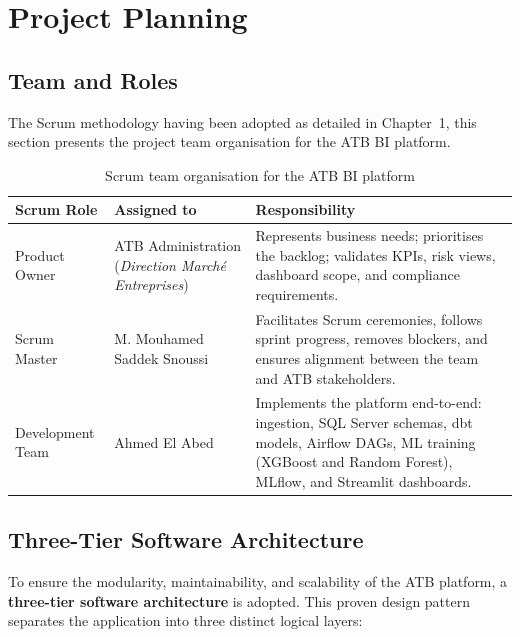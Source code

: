 \section{Project Planning}

\subsection{Team and Roles}

The Scrum methodology having been adopted as detailed in Chapter~1, this section presents
the project team organisation for the ATB BI platform.

\begin{table}[H]
\centering
\caption{Scrum team organisation for the ATB BI platform}
\label{tab:atb_project_roles}
\begin{tabular}{|p{3.5cm}|p{3.8cm}|p{6.2cm}|}
\hline
\rowcolor{blue!15}
\textbf{Scrum Role} & \textbf{Assigned to} & \textbf{Responsibility} \\
\hline
Product Owner & ATB Administration (\textit{Direction March\'{e} Entreprises}) &
Represents business needs; prioritises the backlog; validates KPIs, risk views,
dashboard scope, and compliance requirements. \\
\hline
Scrum Master & M. Mouhamed Saddek Snoussi & Facilitates Scrum ceremonies, follows sprint
progress, removes blockers, and ensures alignment between the team and ATB stakeholders. \\
\hline
Development Team & Ahmed El Abed & Implements the platform end-to-end: ingestion, SQL
Server schemas, dbt models, Airflow DAGs, ML training (XGBoost and Random Forest), MLflow,
and Streamlit dashboards. \\
\hline
\end{tabular}
\end{table}

\subsection{Three-Tier Software Architecture}
\label{sec:atb_three_tier_architecture}

To ensure the modularity, maintainability, and scalability of the ATB platform, a
\textbf{three-tier software architecture} is adopted. This proven design pattern separates
the application into three distinct logical layers:

